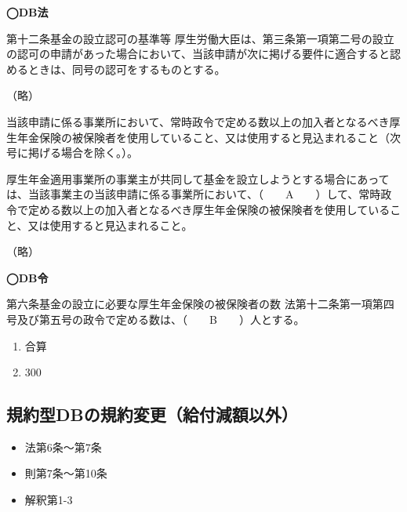 \begin{fillblank}[自作 2026/10/7]

  \noindent \textbf{◯DB法}
  \begin{lawstructure}
    \begin{lawarticle}{第十二条}{基金の設立認可の基準等}
      厚生労働大臣は、第三条第一項第二号の設立の認可の申請があった場合において、当該申請が次に掲げる要件に適合すると認めるときは、同号の認可をするものとする。

      （略）

      当該申請に係る事業所において、常時政令で定める数以上の加入者となるべき厚生年金保険の被保険者を使用していること、又は使用すると見込まれること（次号に掲げる場合を除く。）。

      厚生年金適用事業所の事業主が共同して基金を設立しようとする場合にあっては、当該事業主の当該申請に係る事業所において、（　　A　　）して、常時政令で定める数以上の加入者となるべき厚生年金保険の被保険者を使用していること、又は使用すると見込まれること。

      （略）
    \end{lawarticle}

  \noindent \textbf{◯DB令}

    \begin{lawarticle}{第六条}{基金の設立に必要な厚生年金保険の被保険者の数}
      法第十二条第一項第四号及び第五号の政令で定める数は、（　　B　　）人とする。
    \end{lawarticle}

  \end{lawstructure}

\end{fillblank}

\begin{answerbox}
 \begin{enumerate}[A:]
  \item 合算
  \item 300
 \end{enumerate}
\end{answerbox}

\newpage


\subsection{規約型DBの規約変更（給付減額以外）}


\begin{InyouJobunbox}
  \begin{itemize}
    \item 法第6条〜第7条
    \item 則第7条〜第10条
    \item 解釈第1-3
  \end{itemize}
\end{InyouJobunbox}

